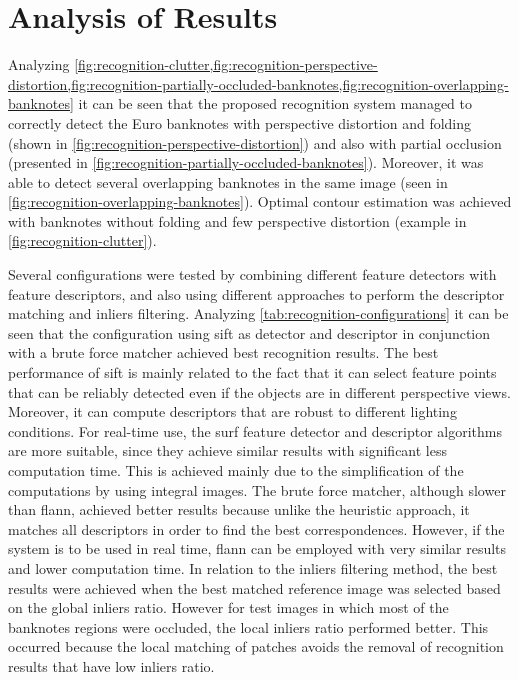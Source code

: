 \section{Analysis of Results}\label{sec:results-analysis}

Analyzing \cref{fig:recognition-clutter,fig:recognition-perspective-distortion,fig:recognition-partially-occluded-banknotes,fig:recognition-overlapping-banknotes} it can be seen that the proposed recognition system managed to correctly detect the Euro banknotes with perspective distortion and folding (shown in \cref{fig:recognition-perspective-distortion}) and also with partial occlusion (presented in \cref{fig:recognition-partially-occluded-banknotes}). Moreover, it was able to detect several overlapping banknotes in the same image (seen in \cref{fig:recognition-overlapping-banknotes}). Optimal contour estimation was achieved with banknotes without folding and few perspective distortion (example in \cref{fig:recognition-clutter}).

Several configurations were tested by combining different feature detectors with feature descriptors, and also using different approaches to perform the descriptor matching and inliers filtering. Analyzing \cref{tab:recognition-configurations} it can be seen that the configuration using \gls{sift} as detector and descriptor in conjunction with a brute force matcher achieved best recognition results. The best performance of \gls{sift} is mainly related to the fact that it can select feature points that can be reliably detected even if the objects are in different perspective views. Moreover, it can compute descriptors that are robust to different lighting conditions. For real-time use, the \gls{surf} feature detector and descriptor algorithms are more suitable, since they achieve similar results with significant less computation time. This is achieved mainly due to the simplification of the computations by using integral images. The brute force matcher, although slower than \gls{flann}, achieved better results because unlike the heuristic approach, it matches all descriptors in order to find the best correspondences. However, if the system is to be used in real time, \gls{flann} can be employed with very similar results and lower computation time. In relation to the inliers filtering method, the best results were achieved when the best matched reference image was selected based on the global inliers ratio. However for test images in which most of the banknotes regions were occluded, the local inliers ratio performed better. This occurred because the local matching of patches avoids the removal of recognition results that have low inliers ratio.
